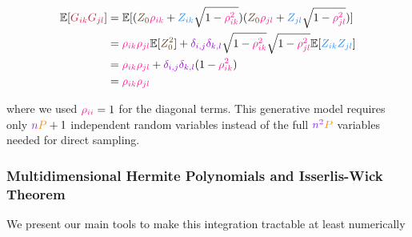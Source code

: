 \documentclass[a4paper]{article}
\theoremstyle{plain}
\theoremstyle{definition}
\theoremstyle{remark}
\begin{document}
\begin{align}
\mathbb{E}[\textcolor{kernelcolor}{G_{ik}} \textcolor{kernelcolor}{G_{jl}}] &= \mathbb{E}[(\textcolor{weightcolor}{Z_0} \textcolor{breakthroughcolor}{\rho_{ik}} + \textcolor{sobolevcolor}{Z_{ik}}\sqrt{1-\textcolor{breakthroughcolor}{\rho_{ik}^2}})(\textcolor{weightcolor}{Z_0} \textcolor{breakthroughcolor}{\rho_{jl}} + \textcolor{sobolevcolor}{Z_{jl}}\sqrt{1-\textcolor{breakthroughcolor}{\rho_{jl}^2}})] \\
&= \textcolor{breakthroughcolor}{\rho_{ik}} \textcolor{breakthroughcolor}{\rho_{jl}} \mathbb{E}[\textcolor{weightcolor}{Z_0^2}] + \textcolor{k3color}{\delta_{i,j}\delta_{k,l}}\sqrt{1-\textcolor{breakthroughcolor}{\rho_{ik}^2}}\sqrt{1-\textcolor{breakthroughcolor}{\rho_{jl}^2}}\mathbb{E}[\textcolor{sobolevcolor}{Z_{ik}}\textcolor{sobolevcolor}{Z_{jl}}] \\
&= \textcolor{breakthroughcolor}{\rho_{ik}} \textcolor{breakthroughcolor}{\rho_{jl}} + \textcolor{k3color}{\delta_{i,j}\delta_{k,l}}(1-\textcolor{breakthroughcolor}{\rho_{ik}^2}) \\
&= \textcolor{breakthroughcolor}{\rho_{ik}} \textcolor{breakthroughcolor}{\rho_{jl}} \label{eq:covariance_verification}
\end{align}

where we used $\textcolor{breakthroughcolor}{\rho_{ii}} = 1$ for the diagonal terms. This generative model requires only $\textcolor{methodcolor}{n}\textcolor{insightcolor}{P} + 1$ independent random variables instead of the full $\textcolor{methodcolor}{n^2}\textcolor{insightcolor}{P}$ variables needed for direct sampling.


\subsubsection{Multidimensional Hermite Polynomials and Isserlis-Wick Theorem}

We present our main tools to make this integration tractable at least numerically
\end{document}
